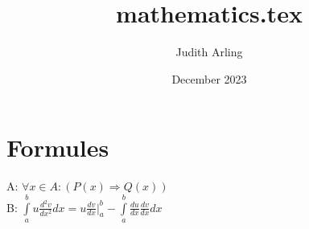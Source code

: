 \documentclass{article}
\title{mathematics.tex}
\author{Judith Arling}
\date{December 2023}
\begin{document}
\maketitle

\section{Formules}
A: $\forall x \in A : (P(x) \Rightarrow Q(x))$\\
B: $\int\limits_a^b u \frac{d^{2}v}{dx^{2}}dx = u\frac{dv}{dx}\Big|_a^b - \int\limits_a^b \frac{du}{dx} \frac{dv}{dx}dx$
\end{document}
